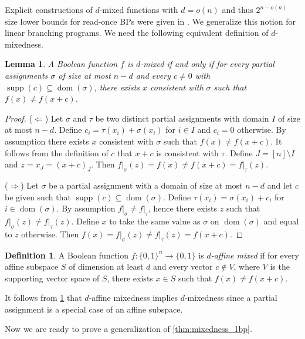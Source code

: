 \documentclass[10pt,a4paper]{article}
\newtheorem{lemma}[theorem]{Lemma}
\theoremstyle{definition}
\newtheorem{definition}[theorem]{Definition}
\theoremstyle{remark}
\DeclareMathOperator{\supp}{supp}
\DeclareMathOperator{\dom}{dom}
\newcommand{\Q}{{\{0,1\}}}
\newcommand{\restr}[2]{\left.#1\right|_{#2}}
\begin{document}
Explicit constructions of $d$-mixed functions with $d = o(n)$ and thus $2^{n - o(n)}$ size lower bounds for read-once BPs were given in \cite{DBLP:journals/tcs/SavickyZ00,DBLP:conf/icalp/AndreevBCR99}. We generalize this notion for linear branching programs. We need the following equivalent definition of $d$-mixedness.

\begin{lemma}\label{lm:equiv_d-mixed}
  A Boolean function $f$ is $d$-mixed if and only if for every partial assignments $\sigma$ of size at most $n-d$ and every $c \neq 0$ with $\supp(c) \subseteq \dom(\sigma)$, there exists $x$ consistent with $\sigma$ such that $f(x) \neq f(x+c)$.
\end{lemma}
\begin{proof}
  ($\Leftarrow$) Let $\sigma$ and $\tau$ be two distinct partial assignments with domain $I$ of size at most $n - d$. Define $c_i = \tau(x_i) + \sigma(x_i)$ for $i \in I$ and $c_i = 0$ otherwise. By assumption there exists $x$ consistent with $\sigma$ such that $f(x) \ne f(x + c)$. It follows from the definition of $c$ that $x+c$ is consistent with $\tau$. Define $J = [n] \setminus I$ and $z = x_{J} = {(x+c)}_J$. Then $\restr{f}{\sigma}(z) = f(x) \neq f(x+c) = \restr{f}{\tau}(z)$.

  ($\Rightarrow$) Let $\sigma$ be a partial assignment with a domain of size at most $n - d$ and let $c$ be given such that $\supp(c) \subseteq \dom(\sigma)$. Define $\tau(x_i) = \sigma(x_i) + c_i$ for $i \in \dom(\sigma)$. By assumption $\restr{f}{\sigma} \neq \restr{f}{\tau}$, hence there exists $z$ such that $\restr{f}{\sigma}(z) \neq \restr{f}{\tau}(z)$. Define $x$ to take the same value as $\sigma$ on $\dom(\sigma)$ and equal to $z$ otherwise. Then $f(x) = \restr{f}{\sigma}(z) \neq \restr{f}{\tau}(z) = f(x+c)$.
\end{proof}

\begin{definition}
  A Boolean function $f\colon \Q^n \to \Q$ is \emph{$d$-affine mixed} if for every affine subspace $S$ of dimension at least $d$ and every vector $c \not\in V$, where $V$ is the supporting vector space of $S$, there exists $x \in S$ such that $f(x) \neq f(x+c)$.
\end{definition}

It follows from \cref{lm:equiv_d-mixed} that $d$-affine mixedness implies $d$-mixedness since a partial assignment is a special case of an affine subspace.

Now we are ready to prove a generalization of \cref{thm:mixedness_1bp}.
\end{document}
